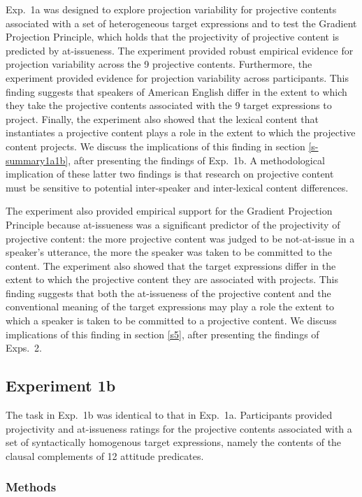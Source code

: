 \documentclass[11pt,fleqn]{article}
\newcommand{\6}{\mbox{$[\hspace*{-.6mm}[$}}
\newcommand{\9}{\mbox{$]\hspace*{-.6mm}]$}}
\begin{document}
Exp.~1a was designed to explore projection variability for projective contents associated with a set of heterogeneous target expressions and to test the Gradient Projection Principle, which holds that the projectivity of projective content is predicted by at-issueness. The experiment provided robust empirical evidence for projection variability across the 9 projective contents. Furthermore, the experiment provided evidence for projection variability across participants. This finding suggests that speakers of American English differ in the extent to which they take the projective contents associated with the 9 target expressions to project. Finally, the experiment also showed that the lexical content that instantiates a projective content plays a role in the extent to which the projective content projects. We discuss the implications of this finding in section \ref{s-summary1a1b}, after presenting the findings of Exp.~1b. A methodological implication of these latter two findings is that research on projective content must be sensitive to potential inter-speaker and inter-lexical content differences.

The experiment also provided empirical support for the Gradient Projection Principle because at-issueness was a significant predictor of the projectivity of projective content: the more projective content was judged to be not-at-issue in a speaker's utterance, the more the speaker was taken to be committed to the content. The experiment also showed that the target expressions differ in the extent to which the projective content they are associated with projects. This finding suggests that both the at-issueness of the projective content and the conventional meaning of the target expressions may play a role the extent to which a speaker is taken to be committed to a projective content. We discuss implications of this finding in section \ref{s5}, after presenting the findings of Exps.~2.

\subsection{Experiment 1b}\label{s-exp1b} 

The task in Exp.~1b was identical to that in Exp.~1a. Participants provided projectivity and at-issueness ratings for the projective contents associated with a set of syntactically homogenous target expressions, namely the contents of the clausal complements of 12 attitude predicates. 

\subsubsection{Methods}
\end{document}
